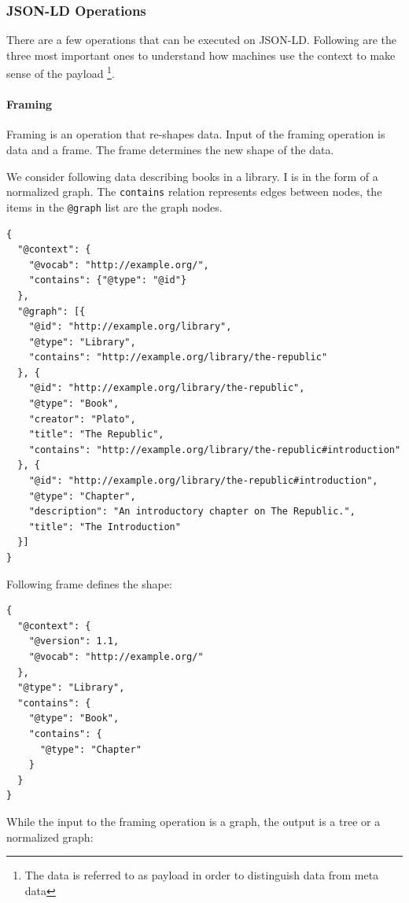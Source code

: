 \subsubsection{JSON-LD Operations}
There are a few operations that can be executed on JSON-LD. Following are the three most important ones to understand how machines use the context to make sense of the payload \footnote{The data is referred to as payload in order to distinguish data from meta data}.

\paragraph{Framing}
Framing is an operation that re-shapes data. Input of the framing operation is data and a frame. The frame determines the new shape of the data.

We consider following data describing books in a library. I is in the form of a normalized graph. The \lstinline{contains} relation represents edges between nodes, the items in the \lstinline{@graph} list are the graph nodes.

\lstset{language=JSON}
\begin{lstlisting}[caption=Data of a library as normalized graph.]
{
  "@context": {
    "@vocab": "http://example.org/",
    "contains": {"@type": "@id"}
  },
  "@graph": [{
    "@id": "http://example.org/library",
    "@type": "Library",
    "contains": "http://example.org/library/the-republic"
  }, {
    "@id": "http://example.org/library/the-republic",
    "@type": "Book",
    "creator": "Plato",
    "title": "The Republic",
    "contains": "http://example.org/library/the-republic#introduction"
  }, {
    "@id": "http://example.org/library/the-republic#introduction",
    "@type": "Chapter",
    "description": "An introductory chapter on The Republic.",
    "title": "The Introduction"
  }]
}
\end{lstlisting}

Following frame defines the shape:

\lstset{language=JSON}
\begin{lstlisting}[caption=Frame for the framing operation.]
{
  "@context": {
    "@version": 1.1,
    "@vocab": "http://example.org/"
  },
  "@type": "Library",
  "contains": {
    "@type": "Book",
    "contains": {
      "@type": "Chapter"
    }
  }
}
\end{lstlisting}

While the input to the framing operation is a graph, the output is a tree or a normalized graph:

